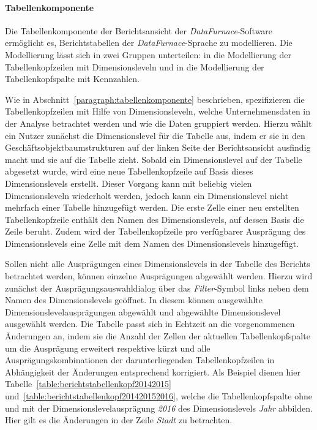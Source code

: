 \documentclass[
  language=german, %
  type=bachelor,%
  ngerman
]{isthesis}
\begin{document}
\begin{content}
  \paragraph{Tabellenkomponente}

  Die Tabellenkomponente der Berichtsansicht der \textit{DataFurnace}-Software
  ermöglicht es, Berichtstabellen der \textit{DataFurnace}-Sprache zu
  modellieren. Die Modellierung lässt sich in zwei Gruppen unterteilen: in die
  Modellierung der Tabellenkopfzeilen mit Dimensionsleveln und in die
  Modellierung der Tabellenkopfspalte mit Kennzahlen.

  Wie in Abschnitt~\ref{paragraph:tabellenkomponente} beschrieben,
  spezifizieren die Tabellenkopfzeilen mit Hilfe von Dimensionsleveln, welche
  Unternehmensdaten in der Analyse betrachtet werden und wie die Daten
  gruppiert werden. Hierzu wählt ein Nutzer zunächst die Dimensionslevel für
  die Tabelle aus, indem er sie in den Geschäftsobjektbaumstrukturen auf der
  linken Seite der Berichtsansicht ausfindig macht und sie auf die Tabelle
  zieht. Sobald ein Dimensionslevel auf der Tabelle abgesetzt wurde, wird eine
  neue Tabellenkopfzeile auf Basis dieses Dimensionslevels erstellt. Dieser
  Vorgang kann mit beliebig vielen Dimensionsleveln wiederholt werden, jedoch
  kann ein Dimensionslevel nicht mehrfach einer Tabelle hinzugefügt werden. Die
  erste Zelle einer neu erstellten Tabellenkopfzeile enthält den Namen des
  Dimensionslevels, auf dessen Basis die Zeile beruht. Zudem wird der
  Tabellenkopfzeile pro verfügbarer Ausprägung des Dimensionslevels eine Zelle
  mit dem Namen des Dimensionslevels hinzugefügt.

  Sollen nicht alle Ausprägungen eines Dimensionslevels in der Tabelle des
  Berichts betrachtet werden, können einzelne Ausprägungen abgewählt werden.
  Hierzu wird zunächst der Ausprägungsauswahldialog über das
  \textit{Filter}-Symbol links neben dem Namen des Dimensionslevels geöffnet.
  In diesem können ausgewählte Dimensionslevelausprägungen abgewählt und abgewählte
  Dimensionslevel ausgewählt werden. Die Tabelle passt sich in Echtzeit an die
  vorgenommenen Änderungen an, indem sie die Anzahl der Zellen der aktuellen
  Tabellenkopfspalte um die Ausprägung erweitert respektive kürzt und alle
  Ausprägungskombinationen der darunterliegenden Tabellenkopfzeilen in
  Abhängigkeit der Änderungen entsprechend korrigiert. Als Beispiel dienen hier
  Tabelle~\ref{table:berichtstabellenkopf20142015}
  und~\ref{table:berichtstabellenkopf201420152016}, welche die Tabellenkopfspalte
  ohne und mit der Dimensionslevelausprägung \textit{2016} des Dimensionslevels
  \textit{Jahr} abbilden. Hier gilt es die Änderungen in der Zeile
  \textit{Stadt} zu betrachten.


\end{content}
\end{document}
